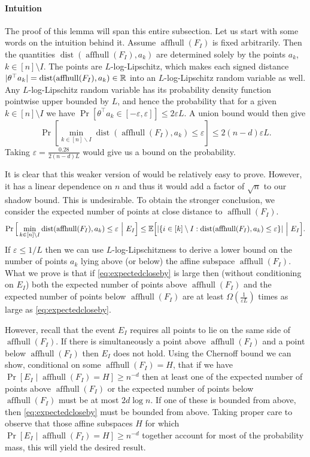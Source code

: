 \documentclass{article}\usepackage[a4paper,margin=20mm]{geometry}
\newcommand{\R}{\mathbb R}
\newcommand{\E}{\mathbb E}
\newcommand{\aff}{\operatorname{affhull}}
\newcommand{\eps}{\varepsilon} %
\newcommand{\dist}{\operatorname{dist}}
\DeclarePairedDelimiter\abs{\lvert}{\rvert}
\begin{document}
\paragraph{Intuition}
The proof of this lemma will span this entire subsection.
Let us start with some words on the intuition behind it.
Assume $\aff(F_I)$ is fixed arbitrarily. Then the quantities $\dist(\aff(F_I),a_k)$
are determined solely by the points $a_k$, $k \in [n]\setminus I$.
The points are $L$-log-Lipschitz, which makes each signed distance $\abs{\theta^\top a_k} = \dist(\aff(F_I), a_k) \in \R$
into an $L$-log-Lipschitz random variable as well.
Any $L$-log-Lipschitz random variable has its probability density function pointwise upper bounded by $L$,
and hence the probability that for a given $k \in [n]\setminus I$ we have
$\Pr[\theta^\top a_k \in [-\eps, \eps]] \leq 2\eps L$.
A union bound would then give
\[\Pr[\min_{k \in [n] \backslash I}\dist(\aff(F_I), a_k)\leq\eps] \leq 2(n-d)\eps L.\]
Taking $\eps = \frac{0.28}{2(n-d)L}$ would give us a bound on the probability.

It is clear that this weaker version of  would be relatively easy to prove.
However, it has a linear dependence on $n$ and thus it would add a factor of $\sqrt{n}$ to our shadow bound.
This is undesirable.
To obtain the stronger conclusion, we consider the expected number of points
at close distance to $\aff(F_I)$.
\begin{equation}
\Pr\Big[\min_{k \in [n] \backslash I}\dist(\aff(F_I), a_k) \leq \eps ~\Big|~ E_I\Big]
\leq
\E\Big[\abs{\{i \in [k]\setminus I : \dist(\aff(F_I),a_k) \leq \eps \}} ~\Big|~ E_I\Big].\label{eq:expectedcloseby}
\end{equation}
If $\eps \leq 1/L$ then we can use $L$-log-Lipschitzness to derive a lower bound on the number of points $a_k$
lying above (or below) the affine subspace $\aff(F_I)$.
What we prove is that if \eqref{eq:expectedcloseby} is large then (without conditioning on $E_I$)
both the expected number of points above $\aff(F_I)$ and the expected number of points below $\aff(F_I)$
are at least $\Omega(\frac{1}{\eps L})$ times as large as \eqref{eq:expectedcloseby}.

However, recall that the event $E_I$ requires all points to lie on the same side of $\aff(F_I)$.
If there is simultaneously a point above $\aff(F_I)$ and a point below $\aff(F_I)$ then $E_I$ does not hold.
Using the Chernoff bound we can show, conditional on some $\aff(F_I) = H$, that if we have
$\Pr[E_I \mid \aff(F_I) = H] \geq n^{-d}$
then at least one of the expected number of points above $\aff(F_I)$ or the expected number of points below
$\aff(F_I)$ must be at most $2d \log n$.
If one of these is bounded from above, then \eqref{eq:expectedcloseby} must be bounded from above.
Taking proper care to observe that those affine subspaces $H$ for which $\Pr[E_I \mid \aff(F_I) = H] \geq n^{-d}$
together account for most of the probability mass, this will yield the desired result.
\end{document}
